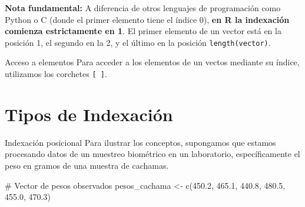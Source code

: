 \documentclass[
  ignorenonframetext,
  aspectratio=169,
  spanish,
]{beamer}
\newenvironment{Shaded}{\begin{snugshade}}{\end{snugshade}}
\newcommand{\CommentTok}[1]{\textcolor[rgb]{0.37,0.37,0.37}{#1}}
\newcommand{\FloatTok}[1]{\textcolor[rgb]{0.68,0.00,0.00}{#1}}
\newcommand{\FunctionTok}[1]{\textcolor[rgb]{0.28,0.35,0.67}{#1}}
\newcommand{\NormalTok}[1]{\textcolor[rgb]{0.00,0.23,0.31}{#1}}
\newcommand{\OtherTok}[1]{\textcolor[rgb]{0.00,0.23,0.31}{#1}}
\begin{document}
\begin{frame}[fragile]{}
\label{section}
\begin{tcolorbox}[enhanced jigsaw, leftrule=.75mm, left=2mm, colback=white, toptitle=1mm, bottomrule=.15mm, arc=.35mm, breakable, title=\textcolor{quarto-callout-important-color}{\faExclamation}\hspace{0.5em}{Importante}, coltitle=black, colbacktitle=quarto-callout-important-color!10!white, bottomtitle=1mm, opacityback=0, rightrule=.15mm, toprule=.15mm, colframe=quarto-callout-important-color-frame, opacitybacktitle=0.6, titlerule=0mm]

\textbf{Nota fundamental:} A diferencia de otros lenguajes de
programación como Python o C (donde el primer elemento tiene el índice
0), \textbf{en R la indexación comienza estrictamente en 1}. El primer
elemento de un vector está en la posición 1, el segundo en la 2, y el
último en la posición \texttt{length(vector)}.

\end{tcolorbox}
\end{frame}

\begin{frame}[fragile]{Acceso a elementos}
\label{acceso-a-elementos}
Para acceder a los elementos de un vectos mediante su índice, utilizamos
los corchetes \texttt{{[}\ {]}}.
\end{frame}

\section{Tipos de Indexación}\label{tipos-de-indexaciuxf3n}

\begin{frame}[fragile]{Indexación posicional}
\label{indexaciuxf3n-posicional}
Para ilustrar los conceptos, supongamos que estamos procesando datos de
un muestreo biométrico en un laboratorio, específicamente el peso en
gramos de una muestra de cachamas.

\begin{Shaded}
\begin{Highlighting}[]
\CommentTok{\# Vector de pesos observados}
\NormalTok{pesos\_cachama }\OtherTok{\textless{}{-}} \FunctionTok{c}\NormalTok{(}\FloatTok{450.2}\NormalTok{, }\FloatTok{465.1}\NormalTok{, }\FloatTok{440.8}\NormalTok{, }\FloatTok{480.5}\NormalTok{, }\FloatTok{455.0}\NormalTok{, }\FloatTok{470.3}\NormalTok{)}
\end{Highlighting}
\end{Shaded}
\end{frame}
\end{document}

